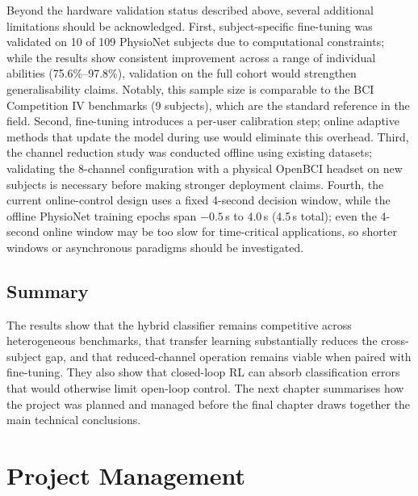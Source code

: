 \documentclass[12pt, a4paper]{article}
\begin{document}
Beyond the hardware validation status described above, several additional limitations should be acknowledged. First, subject-specific fine-tuning was validated on 10 of 109 PhysioNet subjects due to computational constraints; while the results show consistent improvement across a range of individual abilities (75.6\%--97.8\%), validation on the full cohort would strengthen generalisability claims. Notably, this sample size is comparable to the BCI Competition IV benchmarks (9 subjects), which are the standard reference in the field. Second, fine-tuning introduces a per-user calibration step; online adaptive methods that update the model during use would eliminate this overhead. Third, the channel reduction study was conducted offline using existing datasets; validating the 8-channel configuration with a physical OpenBCI headset on new subjects is necessary before making stronger deployment claims. Fourth, the current online-control design uses a fixed 4-second decision window, while the offline PhysioNet training epochs span $-0.5$\,s to $4.0$\,s (4.5\,s total); even the 4-second online window may be too slow for time-critical applications, so shorter windows or asynchronous paradigms should be investigated.

\subsection{Summary}

The results show that the hybrid classifier remains competitive across heterogeneous benchmarks, that transfer learning substantially reduces the cross-subject gap, and that reduced-channel operation remains viable when paired with fine-tuning. They also show that closed-loop RL can absorb classification errors that would otherwise limit open-loop control. The next chapter summarises how the project was planned and managed before the final chapter draws together the main technical conclusions.

\section{Project Management}
\end{document}
